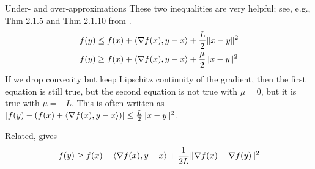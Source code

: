 \documentclass[10pt,handout]{beamer}
\begin{document}
\begin{frame}{Under- and over-approximations}
These two inequalities are very helpful; see, e.g., Thm 2.1.5 and Thm 2.1.10 from \cite{Nesterov_2004}.
\begin{align}
    f(y) &\le f(x) + \left\langle \nabla f(x) ,  y - x  \right\rangle + \frac{L}{2}\|x-y\|^2 \label{eq:L} \\
    f(y) &\ge f(x) + \left\langle \nabla f(x) ,  y - x  \right\rangle + \frac{\mu}{2}\|x-y\|^2 \label{eq:mu}
\end{align}
If we drop convexity but keep Lipschitz continuity of the gradient, then the first equation is still true, but the second equation is not true with $\mu=0$, but it is true with $\mu = -L$.  This is often written as
$\left| f(y) - ( f(x) + \left\langle \nabla f(x) ,  y - x  \right\rangle )\right| \le \frac{L}{2}\|x-y\|^2$.

\bigskip
Related, \cite[Thm.\ 2.1.5, Eq.\ 2.1.10]{Nesterov_2018} gives 
\[
f(y) \ge f(x) + \langle\nabla f(x), y-x\rangle + \frac{1}{2L}\|\nabla f(x)  - \nabla f(y) \|^2 
\]
\end{frame}
\end{document}
